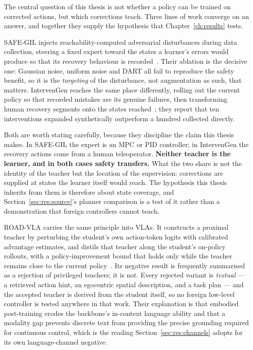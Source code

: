 \documentclass[a4paper,11pt]{report}
\begin{document}
The central question of this thesis is not whether a policy can be trained on corrected actions,
but which corrections teach. Three lines of work converge on an answer, and together they supply
the hypothesis that Chapter~\ref{ch:results} tests.

SAFE-GIL injects reachability-computed adversarial disturbances during data collection, steering a
fixed expert toward the states a learner's errors would produce so that its recovery behaviour is
recorded~\cite{ciftci2025safegil}. Their ablation is the decisive one: Gaussian noise, uniform
noise and DART all fail to reproduce the safety benefit, so it is the \emph{targeting} of the
disturbance, not augmentation as such, that matters. IntervenGen reaches the same place
differently, rolling out the current policy so that recorded mistakes are its genuine failures,
then transforming human recovery segments onto the states reached~\cite{hoque2024intervengen};
they report that ten interventions expanded synthetically outperform a hundred collected directly.

Both are worth stating carefully, because they discipline the claim this thesis makes. In SAFE-GIL
the expert is an MPC or PID controller; in IntervenGen the recovery actions come from a human
teleoperator. \textbf{Neither teacher is the learner, and in both cases safety transfers.} What the
two share is not the identity of the teacher but the location of the supervision: corrections are
supplied at states the learner itself would reach. The hypothesis this thesis inherits from them is
therefore about state coverage, and Section~\ref{sec:res:source}'s planner comparison is a test of
it rather than a demonstration that foreign controllers cannot teach.

ROAD-VLA carries the same principle into VLAs. It constructs a proximal teacher by perturbing the
student's own action-token logits with calibrated advantage estimates, and distils that teacher
along the student's on-policy rollouts, with a policy-improvement bound that holds only while the
teacher remains close to the current policy~\cite{wang2026roadvla}. Its negative result is
frequently summarised as a rejection of privileged teachers; it is not. Every rejected variant is
\emph{textual} --- a retrieved action hint, an egocentric spatial description, and a task plan ---
and the accepted teacher is derived from the student itself, so no foreign low-level controller is
tested anywhere in that work. Their explanation is that embodied post-training erodes the
backbone's in-context language ability and that a modality gap prevents discrete text from
providing the precise grounding required for continuous control, which is the reading
Section~\ref{sec:res:channels} adopts for its own language-channel negative.
\end{document}
